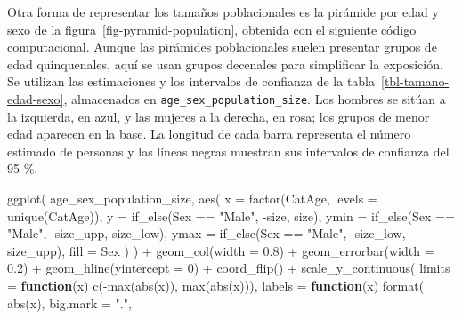 \documentclass[
  spanish,
  11pt,
  letterpaper,
  oneside,
  open=any]{scrbook}
\newenvironment{Shaded}{\begin{snugshade}}{\end{snugshade}}
\newcommand{\AttributeTok}[1]{\textcolor[rgb]{0.40,0.45,0.13}{#1}}
\newcommand{\ControlFlowTok}[1]{\textcolor[rgb]{0.00,0.23,0.31}{\textbf{#1}}}
\newcommand{\DecValTok}[1]{\textcolor[rgb]{0.68,0.00,0.00}{#1}}
\newcommand{\FloatTok}[1]{\textcolor[rgb]{0.68,0.00,0.00}{#1}}
\newcommand{\FunctionTok}[1]{\textcolor[rgb]{0.28,0.35,0.67}{#1}}
\newcommand{\NormalTok}[1]{\textcolor[rgb]{0.00,0.23,0.31}{#1}}
\newcommand{\SpecialCharTok}[1]{\textcolor[rgb]{0.37,0.37,0.37}{#1}}
\newcommand{\StringTok}[1]{\textcolor[rgb]{0.13,0.47,0.30}{#1}}
\begin{document}
Otra forma de representar los tamaños poblacionales es la pirámide por
edad y sexo de la figura~\ref{fig-pyramid-population}, obtenida con el
siguiente código computacional. Aunque las pirámides poblacionales
suelen presentar grupos de edad quinquenales, aquí se usan grupos
decenales para simplificar la exposición. Se utilizan las estimaciones y
los intervalos de confianza de la tabla~\ref{tbl-tamano-edad-sexo},
almacenados en \texttt{age\_sex\_population\_size}. Los hombres se
sitúan a la izquierda, en azul, y las mujeres a la derecha, en rosa; los
grupos de menor edad aparecen en la base. La longitud de cada barra
representa el número estimado de personas y las líneas negras muestran
sus intervalos de confianza del 95 \%.

\begin{Shaded}
\begin{Highlighting}[]
\FunctionTok{ggplot}\NormalTok{(}
\NormalTok{  age\_sex\_population\_size,}
  \FunctionTok{aes}\NormalTok{(}
    \AttributeTok{x =} \FunctionTok{factor}\NormalTok{(CatAge, }\AttributeTok{levels =} \FunctionTok{unique}\NormalTok{(CatAge)),}
    \AttributeTok{y =} \FunctionTok{if\_else}\NormalTok{(Sex }\SpecialCharTok{==} \StringTok{"Male"}\NormalTok{, }\SpecialCharTok{{-}}\NormalTok{size, size),}
    \AttributeTok{ymin =} \FunctionTok{if\_else}\NormalTok{(Sex }\SpecialCharTok{==} \StringTok{"Male"}\NormalTok{, }\SpecialCharTok{{-}}\NormalTok{size\_upp, size\_low),}
    \AttributeTok{ymax =} \FunctionTok{if\_else}\NormalTok{(Sex }\SpecialCharTok{==} \StringTok{"Male"}\NormalTok{, }\SpecialCharTok{{-}}\NormalTok{size\_low, size\_upp),}
    \AttributeTok{fill =}\NormalTok{ Sex}
\NormalTok{  )}
\NormalTok{) }\SpecialCharTok{+}
  \FunctionTok{geom\_col}\NormalTok{(}\AttributeTok{width =} \FloatTok{0.8}\NormalTok{) }\SpecialCharTok{+}
  \FunctionTok{geom\_errorbar}\NormalTok{(}\AttributeTok{width =} \FloatTok{0.2}\NormalTok{) }\SpecialCharTok{+}
  \FunctionTok{geom\_hline}\NormalTok{(}\AttributeTok{yintercept =} \DecValTok{0}\NormalTok{) }\SpecialCharTok{+}
  \FunctionTok{coord\_flip}\NormalTok{() }\SpecialCharTok{+}
  \FunctionTok{scale\_y\_continuous}\NormalTok{(}
    \AttributeTok{limits =} \ControlFlowTok{function}\NormalTok{(x) }\FunctionTok{c}\NormalTok{(}\SpecialCharTok{{-}}\FunctionTok{max}\NormalTok{(}\FunctionTok{abs}\NormalTok{(x)), }\FunctionTok{max}\NormalTok{(}\FunctionTok{abs}\NormalTok{(x))),}
    \AttributeTok{labels =} \ControlFlowTok{function}\NormalTok{(x) }\FunctionTok{format}\NormalTok{(}
      \FunctionTok{abs}\NormalTok{(x),}
      \AttributeTok{big.mark =} \StringTok{"."}\NormalTok{,}

\end{Highlighting}
\end{Shaded}
\end{document}
